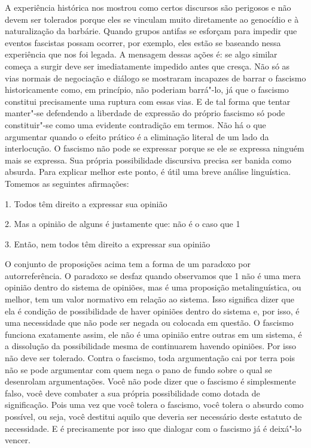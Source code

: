 A experiência histórica nos mostrou como certos discursos são perigosos
e não devem ser tolerados porque eles se vinculam muito diretamente ao
genocídio e à naturalização da barbárie. Quando grupos antifas se
esforçam para impedir que eventos fascistas possam ocorrer, por exemplo,
eles estão se baseando nessa experiência que nos foi legada. A mensagem
dessas ações é: se algo similar começa a surgir deve ser imediatamente
impedido antes que cresça. Não só as vias normais de negociação e
diálogo se mostraram incapazes de barrar o fascismo historicamente
como, em princípio, não poderiam barrá"-lo, já que o fascismo constitui
precisamente uma ruptura com essas vias. E de tal forma que tentar
manter"-se defendendo a liberdade de expressão do próprio fascismo só
pode constituir"-se como uma evidente contradição em termos. Não há o que
argumentar quando o efeito prático é a eliminação literal de um lado da
interlocução. O fascismo não pode se expressar porque se ele se expressa
ninguém mais se expressa. Sua própria possibilidade discursiva precisa
ser banida como absurda. Para explicar melhor este ponto, é útil uma
breve análise linguística. Tomemos as seguintes afirmações:

1. Todos têm direito a expressar sua opinião

2. Mas a opinião de alguns é justamente que: não é o caso que 1

3. Então, nem todos têm direito a expressar sua opinião

O conjunto de proposições acima tem a forma de um paradoxo por
autorreferência. O paradoxo se desfaz quando observamos que 1 não é uma
mera opinião dentro do sistema de opiniões, mas é uma proposição
metalinguística, ou melhor, tem um valor normativo em relação ao
sistema. Isso significa dizer que ela é condição de possibilidade de
haver opiniões dentro do sistema e, por isso, é uma necessidade que
não pode ser negada ou colocada em questão. O fascismo funciona
exatamente assim, ele não é uma opinião entre outras em um sistema, é a
dissolução da possibilidade mesma de continuarem havendo opiniões. Por
isso não deve ser tolerado. Contra o fascismo, toda argumentação cai por
terra pois não se pode argumentar com quem nega o pano de fundo sobre o
qual se desenrolam argumentações. Você não pode dizer que o fascismo é
simplesmente falso, você deve combater a sua própria possibilidade como
dotada de significação. Pois uma vez que você tolera o fascismo, você
tolera o absurdo como possível, ou seja, você destitui aquilo que
deveria ser necessário deste estatuto de necessidade. E é precisamente
por isso que dialogar com o fascismo já é deixá"-lo vencer.


